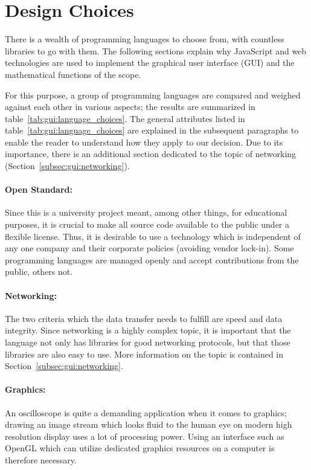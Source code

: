 \section{Design Choices} %
\label{sec:gui:design_choices}

There is  a wealth  of programming  languages to  choose from,  with countless
libraries to go  with them. The following sections explain  why JavaScript and
web technologies are used to implement  the graphical user interface (GUI) and
the mathematical functions of the scope. 

For  this  purpose,  a  group   of  programming  languages  are  compared  and
weighed  against each  other in  various aspects;  the results  are summarized
in   table~\ref{tab:gui:language_choices}.  The   general  attributes   listed
in  table~\ref{tab:gui:language_choices}  are   explained  in  the  subsequent
paragraphs to enable the reader to  understand how they apply to our decision.
Due to its  importance, there is an additional section  dedicated to the topic
of networking (Section~\ref{subsec:gui:networking}).

\paragraph{Open  Standard:} Since this  is a  university project  meant, among
other things, for educational purposes, it  is crucial to make all source code
available to the public under a flexible license. Thus, it is desirable to use
a  technology which  is independent  of any  one company  and their  corporate
policies  (avoiding vendor  lock-in). Some programming  languages are  managed
openly and accept contributions from the public, others not.

\paragraph{Networking:} The  two criteria  which  the data  transfer needs  to
fulfill are  speed and data integrity.   Since networking is a  highly complex
topic,  it is  important that  the language  not only  has libraries  for good
networking  protocols, but  that those  libraries are  also easy  to use. More
information on the topic is contained in Section~\ref{subsec:gui:networking}.

\paragraph{Graphics:} An oscilloscope is quite a demanding application when it
comes to graphics; drawing an image stream  which looks fluid to the human eye
on modern  high resolution display  uses a  lot of processing  power. Using an
interface such as  OpenGL which can utilize dedicated graphics  resources on a
computer is therefore necessary.

